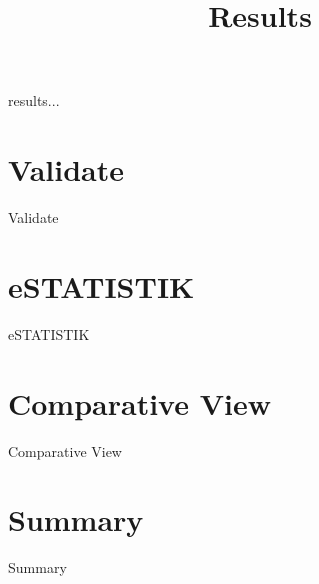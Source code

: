 \title{Results}

results...

\section{Validate}

Validate

\section{eSTATISTIK}

eSTATISTIK

\section{Comparative View}

Comparative View

\section{Summary}

Summary